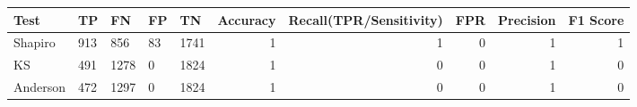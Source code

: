 \begin{tabular}{lllllrrrrr}
\toprule
Test & TP & FN & FP & TN & Accuracy & Recall(TPR/Sensitivity) & FPR & Precision & F1 Score \\
\midrule
Shapiro & 913 & 856 & 83 & 1741 & 1 & 1 & 0 & 1 & 1 \\
KS & 491 & 1278 & 0 & 1824 & 1 & 0 & 0 & 1 & 0 \\
Anderson & 472 & 1297 & 0 & 1824 & 1 & 0 & 0 & 1 & 0 \\
\bottomrule
\end{tabular}
